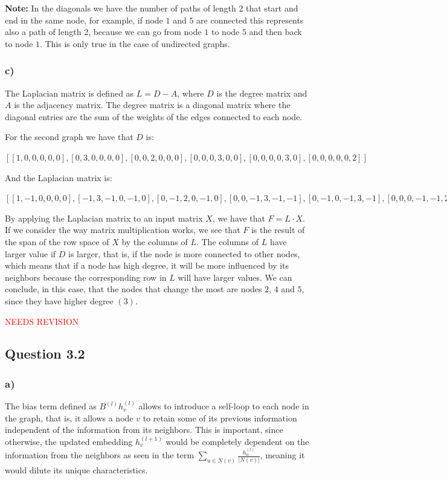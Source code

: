 \documentclass{article}
\begin{document}
\textbf{Note:} In the diagonals we have the number of paths of length 2 that start and end in the same node, for example,
if node $1$ and $5$ are connected this represents also a path of length 2, because we can go from node $1$ to node $5$ and
then back to node $1$. This is only true in the case of undirected graphs.

\subsubsection*{c)}

The Laplacian matrix is defined as $L = D - A$, where $D$ is the degree matrix and $A$ is the adjacency matrix.
The degree matrix is a diagonal matrix where the diagonal entries are the sum of the weights of the edges connected to each node.

For the second graph we have that $D$ is:

$[
[1, 0, 0, 0, 0, 0],
[0, 3, 0, 0, 0, 0],
[0, 0, 2, 0, 0, 0],
[0, 0, 0, 3, 0, 0],
[0, 0, 0, 0, 3, 0],
[0, 0, 0, 0, 0, 2]]$

And the Laplacian matrix is:

$[
[1, -1,  0, 0, 0, 0],
[-1, 3, -1, 0, -1, 0],
[0, -1,  2, 0, -1, 0],
[0, 0,  -1, 3, -1, -1],
[0, -1,  0, -1, 3, -1],
[0, 0,   0, -1, -1, 2]]$

By applying the Laplacian matrix to an input matrix $X$, we have that $F = L \cdot X$. 
If we consider the way matrix multiplication works, we see that $F$ is the result of the span of the row space of $X$ by the columns of $L$.
The columns of $L$ have larger value if $D$ is larger, that is, if the node is more connected to other nodes, which means that
if a node has high degree, it will be more influenced by its neighbors because the corresponding row in $L$ will have larger values.
We can conclude, in this case, that the nodes that change the most are nodes $2$, $4$ and $5$, since they have higher degree $(3)$.

\textcolor{red}{NEEDS REVISION}

\subsection*{Question 3.2}

\subsubsection*{a)}

The bias term defined as $B^{(l)}h_v^{(l)}$ allows to introduce a self-loop to each node in the graph, that is, it allows
a node $v$ to retain some of its previous information independent of the information from its neighbors. This is important,
since otherwise, the updated embedding $h_v^{(l+1)}$ would be completely dependent on the information from the neighbors
as seen in the term $\sum_{u \in N(v)} \frac{h_u^{(l)}}{|N(v)|}$, meaning it would dilute its unique characteristics.
\end{document}
